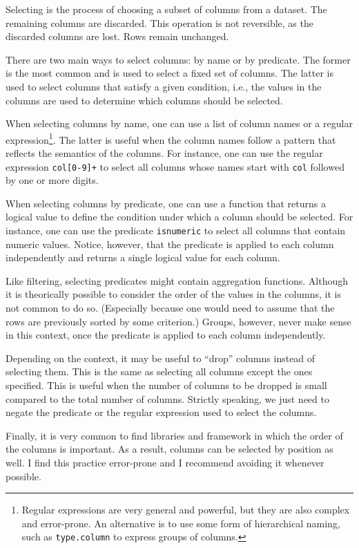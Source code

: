Selecting is the process of choosing a subset of columns from a dataset.  The remaining
columns are discarded.  This operation is not reversible, as the discarded columns are
lost.  Rows remain unchanged.

There are two main ways to select columns: by name or by predicate.  The former is the
most common and is used to select a fixed set of columns.  The latter is used to select
columns that satisfy a given condition, i.e., the values in the columns are used to
determine which columns should be selected.

When selecting columns by name, one can use a list of column names or a regular
expression\footnote{Regular expressions are very general and powerful, but they are also
complex and error-prone.  An alternative is to use some form of hierarchical naming,
such as \texttt{type.column} to express groups of columns.}.
The latter is useful when the column names follow a pattern that reflects the semantics of
the columns.  For instance,
one can use the regular expression \texttt{col[0-9]+} to select all columns whose names
start with \texttt{col} followed by one or more digits.

When selecting columns by predicate, one can use a function that returns a logical value
to define the condition under which a column should be selected.  For instance, one can
use the predicate \texttt{isnumeric} to select all columns that contain numeric values.
Notice, however, that the predicate is applied to each column independently and returns a
single logical value for each column.

Like filtering, selecting predicates might contain aggregation functions.  Although it is
theorically possible to consider the order of the values in the columns, it is not common
to do so.  (Especially because one would need to assume that the rows are previously
sorted by some criterion.) Groups, however, never make sense in this context, once the
predicate is applied to each column independently.

Depending on the context, it may be useful to ``drop'' columns instead of selecting them.
This is the same as selecting all columns except the ones specified.  This is useful when
the number of columns to be dropped is small compared to the total number of columns.
Strictly speaking, we just need to negate the predicate or the regular expression used to
select the columns.

Finally, it is very common to find libraries and framework in which the order of the
columns is important.  As a result, columns can be selected by position as well.
I find this practice error-prone and I recommend avoiding it whenever possible.

